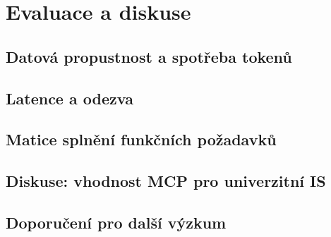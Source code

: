 \chapter{Evaluace a diskuse}
\label{ch:evaluace}

\section{Datová propustnost a spotřeba tokenů}

\section{Latence a odezva}

\section{Matice splnění funkčních požadavků}

\section{Diskuse: vhodnost MCP pro univerzitní IS}

\section{Doporučení pro další výzkum}
